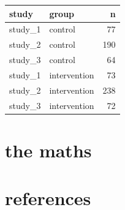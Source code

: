 \documentclass[article,30pt,extrafontsizes]{memoir}
\begin{document}
\begin{adjmulticols*}{3}{0.5in}{0.5in}
{\begin{longtable}[]{@{}llr@{}}
\toprule
study & group & n\tabularnewline
\midrule
\endhead
study\_1 & control & 77\tabularnewline
study\_2 & control & 190\tabularnewline
study\_3 & control & 64\tabularnewline
study\_1 & intervention & 73\tabularnewline
study\_2 & intervention & 238\tabularnewline
study\_3 & intervention & 72\tabularnewline
\bottomrule
\end{longtable}

\vfill\null
\columnbreak

\hypertarget{the-maths}{%
\section{the maths}\label{the-maths}}

\hypertarget{references}{%
\section{references}\label{references}}

\vfill\null
}
\end{adjmulticols*}
\end{document}
